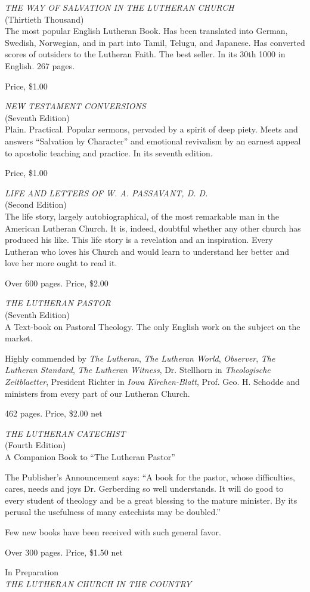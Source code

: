 \begin{titelseite}

\emph{THE WAY OF SALVATION IN THE LUTHERAN CHURCH}\\
(Thirtieth Thousand)\\
The most popular English Lutheran Book. Has been translated into German, Swedish, Norwegian, and in part into Tamil, Telugu, and Japanese. Has converted scores of outsiders to the Lutheran Faith. The best seller. In its 30th 1000 in English. 267 pages.

Price, \$1.00

\emph{NEW TESTAMENT CONVERSIONS}\\
(Seventh Edition)\\
Plain. Practical. Popular sermons, pervaded by a spirit of deep piety. Meets and answers “Salvation by Character” and emotional revivalism by an earnest appeal to apostolic teaching and practice. In its seventh edition.

Price, \$1.00

\emph{LIFE AND LETTERS OF W. A. PASSAVANT, D. D.}\\
(Second Edition)\\
The life story, largely autobiographical, of the most remarkable man in the American Lutheran Church. It is, indeed, doubtful whether any other church has produced his like. This life story is a revelation and an inspiration. Every Lutheran who loves his Church and would learn to understand her better and love her more ought to read it.

Over 600 pages. Price, \$2.00

\emph{THE LUTHERAN PASTOR}\\
(Seventh Edition)\\
A Text-book on Pastoral Theology. The only English work on the subject on the market.

Highly commended by \emph{The Lutheran}, \emph{The Lutheran World}, \emph{Observer}, \emph{The Lutheran Standard}, \emph{The Lutheran Witness}, Dr. Stellhorn in \emph{Theologische Zeitblaetter}, President Richter in \emph{Iowa Kirchen-Blatt}, Prof. Geo. H. Schodde and ministers from every part of our Lutheran Church.

462 pages. Price, \$2.00 net

\emph{THE LUTHERAN CATECHIST}\\
(Fourth Edition)\\
A Companion Book to “The Lutheran Pastor”

The Publisher’s Announcement says: “A book for the pastor, whose difficulties, cares, needs and joys Dr. Gerberding so well understands. It will do good to every student of theology and be a great blessing to the mature minister. By its perusal the usefulness of many catechists may be doubled.”

Few new books have been received with such general favor.

Over 300 pages. Price, \$1.50 net

In Preparation\\
\emph{THE LUTHERAN CHURCH IN THE COUNTRY}
\end{titelseite}

